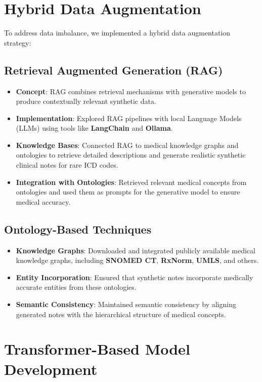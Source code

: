 \documentclass[12pt,a4paper]{report}
\begin{document}
\section{Hybrid Data Augmentation}
To address data imbalance, we implemented a hybrid data augmentation strategy:

\subsection{Retrieval Augmented Generation (RAG)}
\begin{itemize}
    \item \textbf{Concept}: RAG combines retrieval mechanisms with generative models to produce contextually relevant synthetic data.
    \item \textbf{Implementation}: Explored RAG pipelines with local Language Models (LLMs) using tools like \textbf{LangChain} and \textbf{Ollama}.
    \item \textbf{Knowledge Bases}: Connected RAG to medical knowledge graphs and ontologies to retrieve detailed descriptions and generate realistic synthetic clinical notes for rare ICD codes.
    \item \textbf{Integration with Ontologies}: Retrieved relevant medical concepts from ontologies and used them as prompts for the generative model to ensure medical accuracy.
\end{itemize}

\subsection{Ontology-Based Techniques}
\begin{itemize}
    \item \textbf{Knowledge Graphs}: Downloaded and integrated publicly available medical knowledge graphs, including \textbf{SNOMED CT}, \textbf{RxNorm}, \textbf{UMLS}, and others.
    \item \textbf{Entity Incorporation}: Ensured that synthetic notes incorporate medically accurate entities from these ontologies.
    \item \textbf{Semantic Consistency}: Maintained semantic consistency by aligning generated notes with the hierarchical structure of medical concepts.
\end{itemize}

\section{Transformer-Based Model Development}
\end{document}
